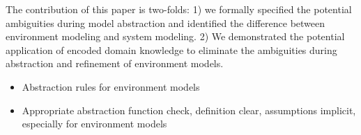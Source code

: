 The contribution of this paper is two-folds: 1) we formally specified the potential ambiguities during model abstraction and identified the difference between environment modeling and system modeling. 2) We demonstrated the potential application of encoded domain knowledge to eliminate the ambiguities during abstraction and refinement of environment models.
\begin{itemize}
	\item Abstraction rules for environment models 
    \item Appropriate abstraction function check, definition clear, assumptions implicit, especially for environment models
\end{itemize}